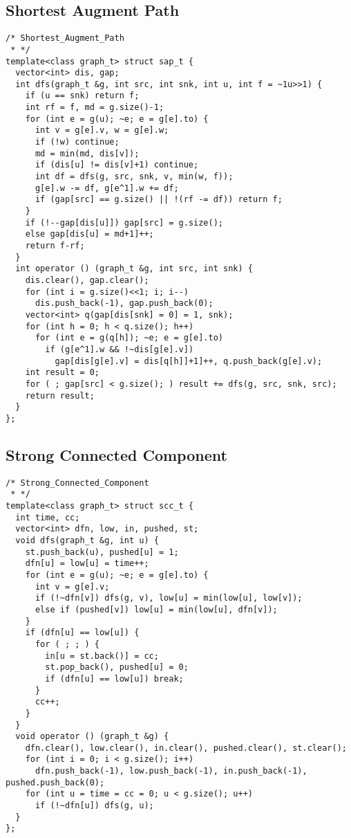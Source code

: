\subsection{Shortest Augment Path}
\begin{lstlisting}
/* Shortest_Augment_Path
 * */
template<class graph_t> struct sap_t {
  vector<int> dis, gap;
  int dfs(graph_t &g, int src, int snk, int u, int f = ~1u>>1) {
    if (u == snk) return f;
    int rf = f, md = g.size()-1;
    for (int e = g(u); ~e; e = g[e].to) {
      int v = g[e].v, w = g[e].w;
      if (!w) continue;
      md = min(md, dis[v]);
      if (dis[u] != dis[v]+1) continue;
      int df = dfs(g, src, snk, v, min(w, f));
      g[e].w -= df, g[e^1].w += df;
      if (gap[src] == g.size() || !(rf -= df)) return f;
    }
    if (!--gap[dis[u]]) gap[src] = g.size();
    else gap[dis[u] = md+1]++;
    return f-rf;
  }
  int operator () (graph_t &g, int src, int snk) {
    dis.clear(), gap.clear();
    for (int i = g.size()<<1; i; i--)
      dis.push_back(-1), gap.push_back(0);
    vector<int> q(gap[dis[snk] = 0] = 1, snk);
    for (int h = 0; h < q.size(); h++)
      for (int e = g(q[h]); ~e; e = g[e].to)
        if (g[e^1].w && !~dis[g[e].v])
          gap[dis[g[e].v] = dis[q[h]]+1]++, q.push_back(g[e].v);
    int result = 0;
    for ( ; gap[src] < g.size(); ) result += dfs(g, src, snk, src);
    return result;
  }
};
\end{lstlisting}


\subsection{Strong Connected Component}
\begin{lstlisting}
/* Strong_Connected_Component
 * */
template<class graph_t> struct scc_t {
  int time, cc;
  vector<int> dfn, low, in, pushed, st;
  void dfs(graph_t &g, int u) {
    st.push_back(u), pushed[u] = 1;
    dfn[u] = low[u] = time++;
    for (int e = g(u); ~e; e = g[e].to) {
      int v = g[e].v;
      if (!~dfn[v]) dfs(g, v), low[u] = min(low[u], low[v]);
      else if (pushed[v]) low[u] = min(low[u], dfn[v]);
    }
    if (dfn[u] == low[u]) {
      for ( ; ; ) {
        in[u = st.back()] = cc;
        st.pop_back(), pushed[u] = 0;
        if (dfn[u] == low[u]) break;
      }
      cc++;
    }
  }
  void operator () (graph_t &g) {
    dfn.clear(), low.clear(), in.clear(), pushed.clear(), st.clear();
    for (int i = 0; i < g.size(); i++)
      dfn.push_back(-1), low.push_back(-1), in.push_back(-1), pushed.push_back(0);
    for (int u = time = cc = 0; u < g.size(); u++)
      if (!~dfn[u]) dfs(g, u);
  }
};
\end{lstlisting}


